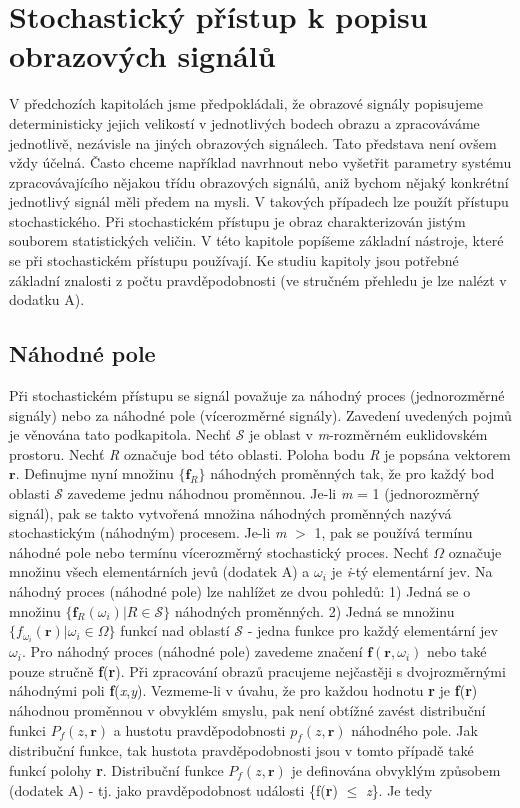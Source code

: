 \chapter*{Stochastický přístup k popisu obrazových signálů}

V předchozích kapitolách jsme předpokládali, že obrazové signály popisujeme deterministicky jejich velikostí v jednotlivých bodech obrazu a zpracováváme jednotlivě, nezávisle na jiných obrazových signálech. Tato představa není ovšem vždy účelná. Často chceme například navrhnout nebo vyšetřit parametry systému zpracovávajícího nějakou třídu obrazových signálů, aniž bychom nějaký konkrétní jednotlivý signál měli předem na mysli. V takových případech lze použít přístupu stochastického. Při stochastickém přístupu je obraz charakterizován jistým souborem statistických veličin. V této kapitole popíšeme základní nástroje, které se při stochastickém přístupu používají. Ke studiu kapitoly jsou potřebné základní znalosti z počtu pravděpodobnosti (ve stručném přehledu je lze nalézt v dodatku A).

\section*{Náhodné pole} \label{sec:nahodne_pole}

Při stochastickém přístupu se signál považuje za náhodný proces (jednorozměrné signály) nebo za náhodné pole (vícerozměrné signály). Zavedení uvedených pojmů je věnována tato podkapitola. Nechť $\mathscr{S}$ je oblast v \textit{m}-rozměrném euklidovském prostoru. Nechť \textit{R} označuje bod této oblasti. Poloha bodu \textit{R} je popsána vektorem $\mathbf{r}$. Definujme nyní množinu $\{\mathbf{f}_R\}$ náhodných proměnných tak, že pro každý bod oblasti $\mathscr{S}$ zavedeme jednu náhodnou proměnnou. Je-li \textit{m} = 1 (jednorozměrný signál), pak se takto vytvořená množina náhodných proměnných nazývá stochastickým (náhodným) procesem. Je-li \textit{m} $>$ 1, pak se používá termínu náhodné pole nebo termínu vícerozměrný stochastický proces. Nechť $\Omega$ označuje množinu všech elementárních jevů (dodatek A) a $\omega_i$ je \textit{i}-tý elementární jev. Na náhodný proces (náhodné pole) lze nahlížet ze dvou pohledů: 1) Jedná se o množinu $\{\mathbf{f}_R(\omega_i) | R \in \mathscr{S}\}$ náhodných proměnných. 2) Jedná se množinu $\{f_{\omega_i}(\mathbf{r}) | \omega_i \in \Omega\}$ funkcí nad oblastí $\mathscr{S}$ - jedna funkce pro každý elementární jev $\omega_i$. Pro náhodný proces (náhodné pole) zavedeme značení $\mathbf{f}(\mathbf{r}, \omega_i)$ nebo také pouze stručně \textbf{f}(\textbf{r}). Při zpracování obrazů pracujeme nejčastěji s dvojrozměrnými náhodnými poli \textbf{f}(\textit{x},\textit{y}). Vezmeme-li v úvahu, že pro každou hodnotu \textbf{r} je \textbf{f}(\textbf{r}) náhodnou proměnnou v obvyklém smyslu, pak není obtížné zavést distribuční funkci $P_f(z, \mathbf{r})$ a hustotu pravděpodobnosti $p_f(z, \mathbf{r})$ náhodného pole. Jak distribuční funkce, tak hustota pravděpodobnosti jsou v tomto případě také funkcí polohy \textbf{r}. Distribuční funkce $P_f(z, \mathbf{r})$ je definována obvyklým způsobem (dodatek A) - tj. jako pravděpodobnost události \{f(\textbf{r}) $\leq$ \textit{z}\}. Je tedy

